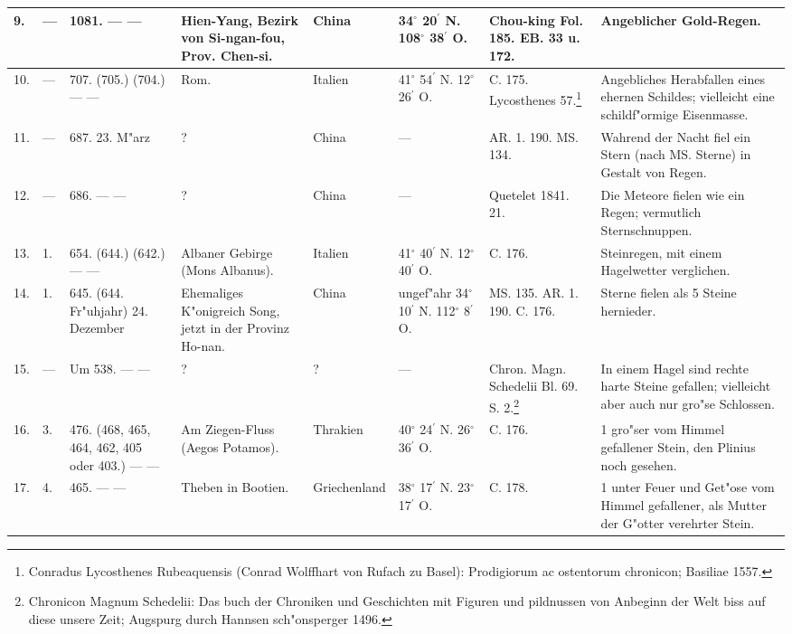 \documentclass[a4paper, 8pt, oneside, polutonikogreek, german]{article}
\begin{document}
\begin{center}
\begin{longtable}{| p{5mm} | p{3mm} | p{15mm} | p{25mm} | p{20mm} | p{14mm} | p{17mm} | p{24mm} |}
        9. & --- & 1081. --- --- & Hien-Yang, Bezirk von Si-ngan-fou, Prov. Chen-si. & China & 34$^\circ$ 20$^\prime$ N. 108$^\circ$ 38$^\prime$ O. & Chou-king Fol. 185. EB. 33 u. 172. & Angeblicher Gold-Regen. \\ \hline
        10. & --- & 707. (705.) (704.) --- --- & Rom. & Italien & 41$^\circ$ 54$^\prime$ N. 12$^\circ$ 26$^\prime$ O. & C. 175. Lycosthenes 57.\footnote{Conradus Lycosthenes Rubeaquensis (Conrad Wolffhart von Rufach zu Basel): Prodigiorum ac ostentorum chronicon; Basiliae 1557.} & Angebliches Herabfallen eines ehernen Schildes; vielleicht eine schildf"ormige Eisenmasse. \\ \hline
        11. & --- & 687. 23. M"arz & ? & China & --- & AR. 1. 190. MS. 134. & Wahrend der Nacht fiel ein Stern (nach MS. Sterne) in Gestalt von Regen. \\ \hline
        12. & --- & 686. --- --- & ? & China & --- & Quetelet 1841. 21. & Die Meteore fielen wie ein Regen; vermutlich Sternschnuppen. \\ \hline
        13. & 1. & 654. (644.) (642.) --- --- & Albaner Gebirge (Mons Albanus). & Italien & 41$^\circ$ 40$^\prime$ N. 12$^\circ$ 40$^\prime$ O. & C. 176. & Steinregen, mit einem Hagelwetter verglichen. \\ \hline
        14. & 1. & 645. (644. Fr"uhjahr) 24. Dezember & Ehemaliges K"onigreich Song, jetzt in der Provinz Ho-nan. & China & ungef"ahr 34$^\circ$ 10$^\prime$ N. 112$^\circ$ 8$^\prime$ O. & MS. 135. AR. 1. 190. C. 176. & Sterne fielen als 5 Steine hernieder. \\ \hline
        15. & --- & Um 538. --- --- & ? & ? & --- & Chron. Magn. Schedelii Bl. 69. S. 2.\footnote{Chronicon Magnum Schedelii: Das buch der Chroniken und Geschichten mit Figuren und pildnussen von Anbeginn der Welt biss auf diese unsere Zeit; Augspurg durch Hannsen sch"onsperger 1496.} & In einem Hagel sind rechte harte Steine gefallen; vielleicht aber auch nur gro"se Schlossen. \\ \hline
        16. & 3. & 476. (468, 465, 464, 462, 405 oder 403.) --- --- & Am Ziegen-Fluss (Aegos Potamos). & Thrakien & 40$^\circ$ 24$^\prime$ N. 26$^\circ$ 36$^\prime$ O. & C. 176. & 1 gro"ser vom Himmel gefallener Stein, den Plinius noch gesehen. \\ \hline
        17. & 4. & 465. --- --- & Theben in Bootien. & Griechenland & 38$^\circ$ 17$^\prime$ N. 23$^\circ$ 17$^\prime$ O. & C. 178. & 1 unter Feuer und Get"ose vom Himmel gefallener, als Mutter der G"otter verehrter Stein. \\ \hline

\end{longtable}
\end{center}
\end{document}
